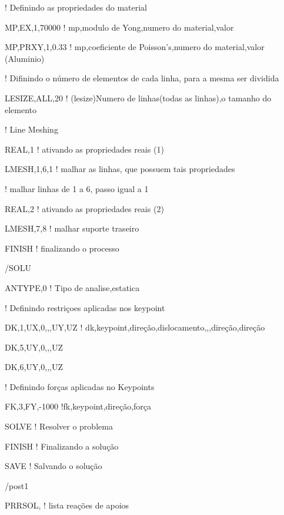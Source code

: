 \begin{anexosenv}
! Definindo as propriedades do material

MP,EX,1,70000 ! mp,modulo de Yong,numero do material,valor

MP,PRXY,1,0.33 ! mp,coeficiente de Poisson's,numero do material,valor (Aluminio)

! Difinindo o número de elementos de cada linha, para a mesma ser dividida

LESIZE,ALL,20 ! (lesize)Numero de linhas(todas as linhas),o tamanho do elemento

! Line Meshing 

REAL,1 ! ativando as propriedades reais (1) 

LMESH,1,6,1 ! malhar as linhas, que possuem tais propriedades

! malhar linhas de 1 a 6, passo igual a 1

REAL,2 ! ativando as propriedades reais (2) 

LMESH,7,8 ! malhar suporte traseiro

FINISH ! finalizando o processo

/SOLU  

ANTYPE,0 ! Tipo de analise,estatica 

! Definindo restriçoes aplicadas nos keypoint

DK,1,UX,0,,,UY,UZ ! dk,keypoint,direção,dislocamento,,,direção,direção

DK,5,UY,0,,,UZ 

DK,6,UY,0,,,UZ 

! Definindo forças aplicadas no Keypoints 

FK,3,FY,-1000 !fk,keypoint,direção,força 

SOLVE ! Resolver o problema

FINISH ! Finalizando a solução

SAVE ! Salvando o solução

/post1

PRRSOL,	! lista reações de apoios 




\end{anexosenv}

